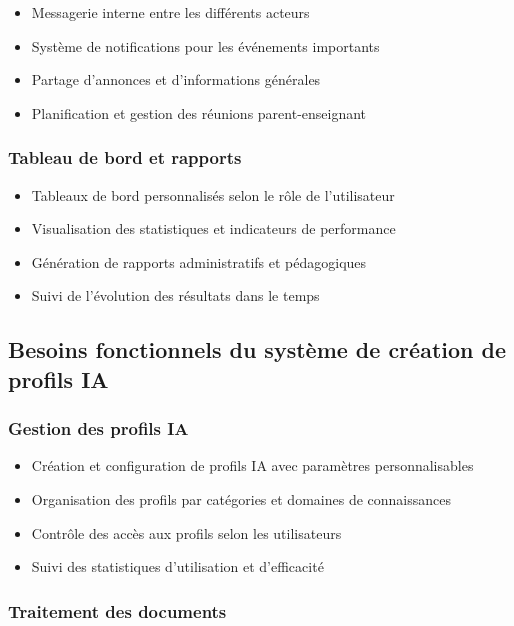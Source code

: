 \begin{itemize}
  \item Messagerie interne entre les différents acteurs
  \item Système de notifications pour les événements importants
  \item Partage d'annonces et d'informations générales
  \item Planification et gestion des réunions parent-enseignant
\end{itemize}

\subsubsection{Tableau de bord et rapports}

\begin{itemize}
  \item Tableaux de bord personnalisés selon le rôle de l'utilisateur
  \item Visualisation des statistiques et indicateurs de performance
  \item Génération de rapports administratifs et pédagogiques
  \item Suivi de l'évolution des résultats dans le temps
\end{itemize}

\subsection{Besoins fonctionnels du système de création de profils IA}

\subsubsection{Gestion des profils IA}

\begin{itemize}
  \item Création et configuration de profils IA avec paramètres personnalisables
  \item Organisation des profils par catégories et domaines de connaissances
  \item Contrôle des accès aux profils selon les utilisateurs
  \item Suivi des statistiques d'utilisation et d'efficacité
\end{itemize}

\subsubsection{Traitement des documents}

